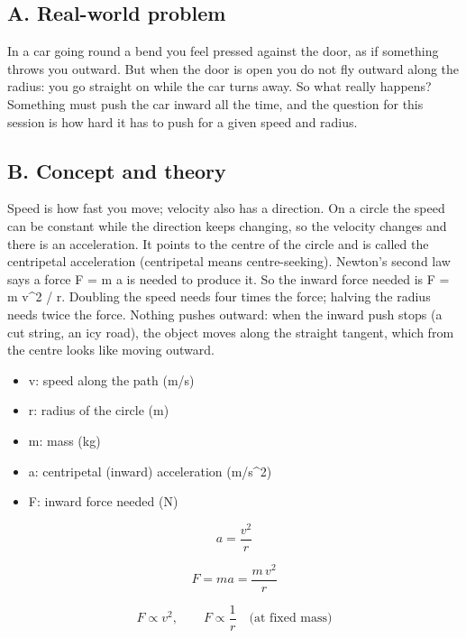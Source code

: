 \documentclass[11pt,a4paper]{article}
\begin{document}
\subsection*{A. Real-world problem}
In a car going round a bend you feel pressed against the door, as if something throws you outward. But when the door is open you do not fly outward along the radius: you go straight on while the car turns away. So what really happens? Something must push the car inward all the time, and the question for this session is how hard it has to push for a given speed and radius.

\subsection*{B. Concept and theory}
Speed is how fast you move; velocity also has a direction. On a circle the speed can be constant while the direction keeps changing, so the velocity changes and there is an acceleration. It points to the centre of the circle and is called the centripetal acceleration (centripetal means centre-seeking). Newton's second law says a force F = m a is needed to produce it. So the inward force needed is F = m v\textasciicircum{}2 / r. Doubling the speed needs four times the force; halving the radius needs twice the force. Nothing pushes outward: when the inward push stops (a cut string, an icy road), the object moves along the straight tangent, which from the centre looks like moving outward.

\begin{itemize}[nosep]
\item v: speed along the path (m/s)
\item r: radius of the circle (m)
\item m: mass (kg)
\item a: centripetal (inward) acceleration (m/s\textasciicircum{}2)
\item F: inward force needed (N)
\end{itemize}

\begin{equation*}
a=\frac{v^{2}}{r}
\end{equation*}

\begin{equation*}
F=ma=\frac{m\,v^{2}}{r}
\end{equation*}

\begin{equation*}
F\propto v^{2},\qquad F\propto \frac{1}{r}\quad\text{(at fixed mass)}
\end{equation*}
\end{document}
